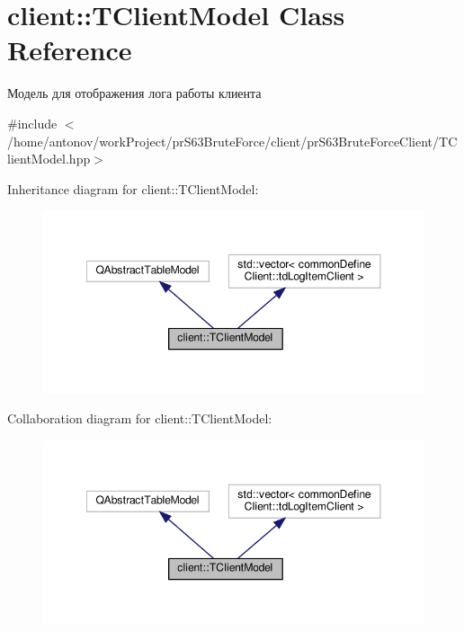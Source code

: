 \hypertarget{classclient_1_1_t_client_model}{}\section{client\+:\+:T\+Client\+Model Class Reference}
\label{classclient_1_1_t_client_model}


Модель для отображения лога работы клиента  




{\ttfamily \#include $<$/home/antonov/work\+Project/pr\+S63\+Brute\+Force/client/pr\+S63\+Brute\+Force\+Client/\+T\+Client\+Model.\+hpp$>$}



Inheritance diagram for client\+:\+:T\+Client\+Model\+:\nopagebreak
\begin{figure}[H]
\begin{center}
\leavevmode
\includegraphics[width=348pt]{classclient_1_1_t_client_model__inherit__graph}
\end{center}
\end{figure}


Collaboration diagram for client\+:\+:T\+Client\+Model\+:\nopagebreak
\begin{figure}[H]
\begin{center}
\leavevmode
\includegraphics[width=348pt]{classclient_1_1_t_client_model__coll__graph}
\end{center}
\end{figure}
